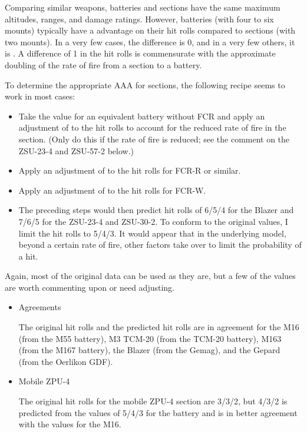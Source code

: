 {    Comparing similar weapons, batteries and sections have the same maximum altitudes, ranges, and damage ratings.
    However, batteries (with four to six mounts) typically have a  advantage on their hit rolls compared to sections (with two mounts).
    In a very few cases, the difference is 0, and in a very few others, it is .
    A difference of 1 in the hit rolls is commensurate with the approximate doubling of the rate of fire from a section to a battery.

    To determine the appropriate AAA for sections, the following recipe seems to work in most cases:
    \begin{itemize}
        \item Take the value for an equivalent battery without FCR and apply an adjustment of  to the hit rolls to account for the reduced rate of fire in the section. (Only do this if the rate of fire is reduced; see the comment on the ZSU-23-4 and ZSU-57-2 below.)
        \item Apply an adjustment of  to the hit rolls for FCR-R or similar.
        \item Apply an adjustment of  to the hit rolls for FCR-W.
        \item The preceding steps would then predict hit rolls of 6/5/4 for the Blazer and 7/6/5 for the ZSU-23-4 and ZSU-30-2. To conform to the original values, I limit the hit rolls to 5/4/3. It would appear that in the underlying model, beyond a certain rate of fire, other factors take over to limit the probability of a hit.
    \end{itemize}


    Again, most of the original data can be used as they are, but a few of the values are worth commenting upon or need adjusting.
    \begin{itemize}
        \item Agreements

            The original hit rolls and the predicted hit rolls are in agreement for the M16 (from the M55 battery), M3 TCM-20 (from the TCM-20 battery), M163 (from the M167 battery), the Blazer (from the Gemag), and the Gepard (from the Oerlikon GDF).

        \item Mobile ZPU-4

            The original hit rolls for the mobile ZPU-4 section are 3/3/2, but 4/3/2 is predicted from the values of 5/4/3 for the battery and is in better agreement with the values for the M16.


\end{itemize}}
